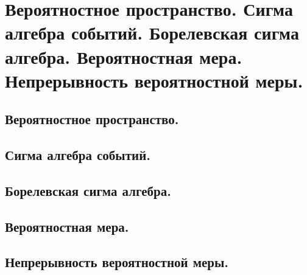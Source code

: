\section{Вероятностное пространство. Сигма алгебра событий. Борелевская сигма алгебра. Вероятностная мера. Непрерывность вероятностной меры.}

\subsection{Вероятностное пространство.}

\begin{definition}

\end{definition}

\subsection{Сигма алгебра событий.}

\subsection{Борелевская сигма алгебра.}

\subsection{Вероятностная мера.}

\subsection{Непрерывность вероятностной меры.}